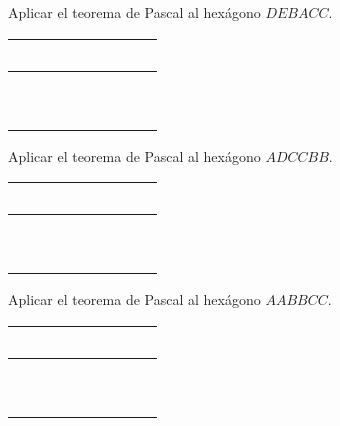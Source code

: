 \newpage
\begin{section-exercise}
    Aplicar el teorema de Pascal al hexágono $DEBACC$. \hspace{1cm}
    \begin{tabular}{|c|c|c|}
        \hline
        \ \ \ \ && \\\hline
        &\ \ \ \ & \\\hline\hline
        &&\ \ \ \ \\\hline
    \end{tabular}
    \vspace*{\fill}
    \begin{figure}[H]
        \centering
        
    \end{figure}
    \vspace*{\fill}
\end{section-exercise}

\newpage
\begin{section-exercise}
    Aplicar el teorema de Pascal al hexágono $ADCCBB$. \hspace{1cm}
    \begin{tabular}{|c|c|c|}
        \hline
        \ \ \ \ && \\\hline
        &\ \ \ \ & \\\hline\hline
        &&\ \ \ \ \\\hline
    \end{tabular}
    \vspace*{\fill}
    \begin{figure}[H]
        \centering
        
    \end{figure}
    \vspace*{\fill}
\end{section-exercise}

\newpage
\begin{section-exercise}
    Aplicar el teorema de Pascal al hexágono $AABBCC$. \hspace{1cm}
    \begin{tabular}{|c|c|c|}
        \hline
        \ \ \ \ && \\\hline
        &\ \ \ \ & \\\hline\hline
        &&\ \ \ \ \\\hline
    \end{tabular}
    \vspace*{\fill}
    \begin{figure}[H]
        \centering
        
    \end{figure}
    \vspace*{\fill}
\end{section-exercise}



